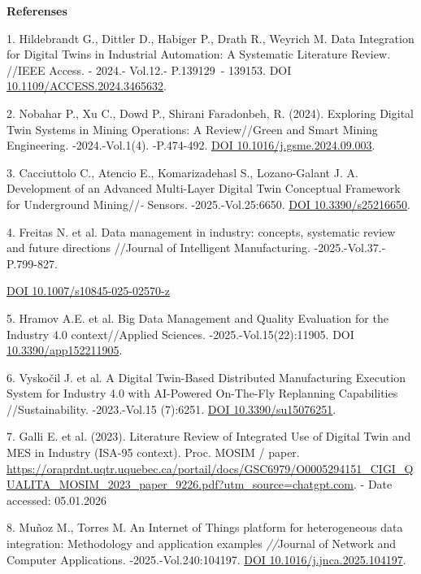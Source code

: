 \begin{center}
{\bfseries Referenses}
\end{center}

\begin{refs}
1. Hildebrandt G., Dittler D., Habiger P., Drath R., Weyrich M. Data
Integration for Digital Twins in Industrial Automation: A Systematic
Literature Review\emph{.} //IEEE Access. - 2024.- Vol.12.- P.139129~-
139153. DOI
\href{https://doi.org/10.1109/ACCESS.2024.3465632}{10.1109/ACCESS.2024.3465632}.

2. Nobahar P., Xu C., Dowd P., Shirani Faradonbeh, R. (2024). Exploring
Digital Twin Systems in Mining Operations: A Review//Green and Smart
Mining Engineering. -2024.-Vol.1(4). -P.474-492.
\href{https://doi.org/10.1016/j.gsme.2024.09.003}{DOI
10.1016/j.gsme.2024.09.003}.

3. Cacciuttolo C., Atencio E., Komarizadehasl S., Lozano-Galant J. A.
Development of an Advanced Multi-Layer Digital Twin Conceptual Framework
for Underground Mining//\emph{-} Sensors. -2025.-Vol.25:6650.
\href{https://doi.org/10.3390/s25216650}{DOI 10.3390/s25216650}.

4. Freitas N. et al. Data management in industry: concepts, systematic
review and future directions //Journal of Intelligent Manufacturing.
-2025.-Vol.37.- P.799-827.

\href{https://link.springer.com/article/10.1007/s10845-025-02570-z}{DOI
10.1007/s10845-025-02570-z}

5. Hramov A.E. et al. Big Data Management and Quality Evaluation for the
Industry 4.0 context//Applied Sciences. -2025.-Vol.15(22):11905. DOI
\href{https://doi.org/10.3390/app152211905}{10.3390/app152211905}.

6. Vyskočil J. et al. A Digital Twin-Based Distributed Manufacturing
Execution System for Industry 4.0 with AI-Powered On-The-Fly Replanning
Capabilities //Sustainability. -2023.-Vol.15 (7):6251.
\href{https://doi.org/10.3390/su15076251}{DOI 10.3390/su15076251}.

7. Galli E. et al. (2023). Literature Review of Integrated Use of
Digital Twin and MES in Industry (ISA-95 context). Proc. MOSIM / paper.
\url{https://oraprdnt.uqtr.uquebec.ca/portail/docs/GSC6979/O0005294151_CIGI_QUALITA_MOSIM_2023_paper_9226.pdf?utm_source=chatgpt.com}.
- Date accessed: 05.01.2026

8. Muñoz M., Torres M. An Internet of Things platform for heterogeneous
data integration: Methodology and application examples \emph{//}Journal
of Network and Computer Applications. -2025.-Vol.240:104197.
\href{https://doi.org/10.1016/j.jnca.2025.104197}{DOI
10.1016/j.jnca.2025.104197}.


\end{refs}
